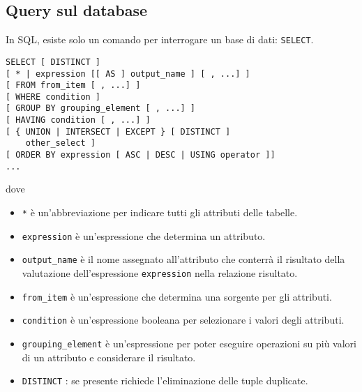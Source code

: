 \documentclass[a4paper, 10pt, titlepage]{article}
\begin{document}
	\subsection{Query sul database}
		In SQL, esiste solo un comando per interrogare un base di dati: \lstinline|SELECT|.
		\begin{lstlisting}
SELECT [ DISTINCT ]
[ * | expression [[ AS ] output_name ] [ , ...] ]
[ FROM from_item [ , ...] ]
[ WHERE condition ]
[ GROUP BY grouping_element [ , ...] ]
[ HAVING condition [ , ...] ]
[ { UNION | INTERSECT | EXCEPT } [ DISTINCT ]
	other_select ]
[ ORDER BY expression [ ASC | DESC | USING operator ]]
...
		\end{lstlisting}
		dove
		\begin{itemize}
			\item \lstinline|*| è un’abbreviazione per indicare tutti gli attributi delle tabelle.
			\item \lstinline|expression| è un’espressione che determina un attributo.
			\item \lstinline|output_name| è il nome assegnato all’attributo che conterrà il risultato
			della valutazione dell’espressione \lstinline|expression| nella relazione risultato.
			\item \lstinline|from_item| è un’espressione che determina una sorgente per gli attributi.
			\item \lstinline|condition| è un’espressione booleana per selezionare i valori degli
			attributi.
			\item \lstinline|grouping_element| è un’espressione per poter eseguire operazioni su
			più valori di un attributo e considerare il risultato.
			\item \lstinline|DISTINCT| : se presente richiede l’eliminazione delle tuple duplicate.
		\end{itemize}
		
\end{document}
